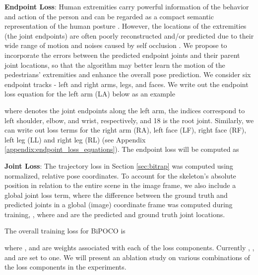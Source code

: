 \documentclass[nohyperref]{article}
\theoremstyle{plain}
\theoremstyle{definition}
\theoremstyle{remark}
\begin{document}
\vspace{-1mm}

\textbf{Endpoint Loss}: 
Human extremities carry powerful information of the behavior and action of the person and can be regarded as a compact semantic representation of the
human posture \cite{yu2009human}. However, the locations of the extremities (the joint endpoints) are often poorly reconstructed and/or predicted due to their wide range of motion and noises caused by self occlusion \cite{huang2018deep, du2020unsupervised}. We propose to incorporate the errors between the predicted endpoint joints and their parent joint locations, so that the algorithm may better learn the motion of the pedestrians' extremities and enhance the overall pose prediction. We consider six endpoint tracks - left and right arms, legs, and faces. We write out the endpoint loss equation for the left arm (LA) below as an example

where  denotes the joint endpoints along the left arm,  the indices  correspond to left shoulder, elbow, and wrist, respectively, and 18 is the root joint. Similarly, we can write out loss terms for the right arm (RA), left face (LF), right face (RF), left leg (LL) and right leg (RL) (see Appendix \ref{appendix:endpoint_loss_equations}). The endpoint loss will be computed as 



\vspace{-1mm}

\textbf{Joint Loss}: The trajectory loss in Section \ref{sec:bitrap} was computed using normalized, relative pose coordinates. To account for the skeleton’s absolute position in relation to the entire scene in the image frame, we also include a global joint loss term, where the difference between the ground truth and predicted joints in a global (image) coordinate frame was computed during training, ,
where  and  are the predicted and ground truth joint locations. 


The overall training loss for BiPOCO is

where ,  and  are weights associated with each of the loss components. Currently , , and  are set to one. We will present an ablation study on various combinations of the loss components in the experiments. 

\vspace{-3mm}
\end{document}
